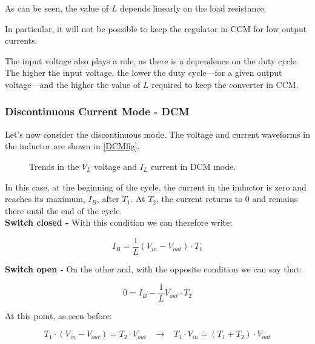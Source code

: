 \documentclass[../main.tex]{subfiles}
\begin{document}
As can be seen, the value of $L$ depends linearly on the load resistance.

In particular, it will not be possible to keep the regulator in CCM for low output currents. 

The input voltage also plays a role, as there is a dependence on the duty cycle. The higher the input voltage, the lower the duty cycle—for a given output voltage—and the higher the value of $L$ required to keep the converter in CCM.

\subsubsection*{Discontinuous Current Mode - DCM}


Let’s now consider the discontinuous mode. 
The voltage and current waveforms in the inductor are shown in \autoref{DCMfig}.

\begin{figure}
\begin{center}

\caption{Trends in the $V_L$ voltage and $I_L$ current in DCM mode.}
\label{DCMfig}	
\end{center}	
\end{figure}

In this case, at the beginning of the cycle, the current in the inductor is zero and reaches its maximum, $I_B$, after $T_1$. At $T_2$, the current returns to 0 and remains there until the end of the cycle.\\

\textbf{Switch closed -} With this condition we can therefore write:

\begin{equation}
	I_B = \frac{1}{L}(V_{in} - V_{out}) \cdot T_1
\end{equation}

\textbf{Switch open -} On the other and, with the opposite condition we can say that: 

\begin{equation}
	0 = I_B - \frac{1}{L} V_{out} \cdot T_2
\end{equation}

At this point, as seen before:

\begin{equation}
	T_1 \cdot (V_{in} - V_{out}) = T_2 \cdot V_{out} \hspace{10pt} \longrightarrow \hspace{10pt} T_1 \cdot V_{in} = (T_1 + T_2) \cdot V_{out}
\end{equation}
\end{document}
